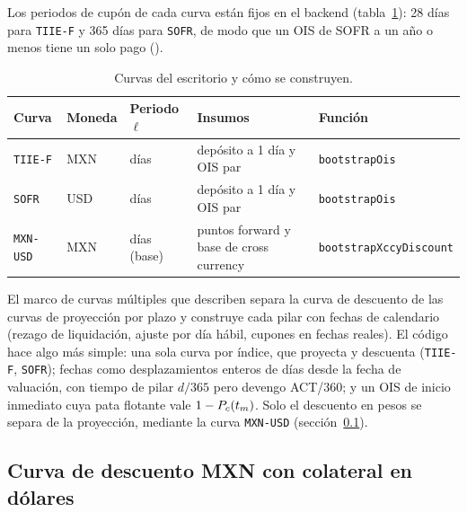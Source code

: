 Los periodos de cupón de cada curva están fijos en el backend (tabla~\ref{tab:cap02-curvas}): 28 días para
\texttt{TIIE-F} y 365 días para \texttt{SOFR}, de modo que un OIS de SOFR a un año o menos tiene un solo pago
().

\begin{table}[ht]
  \centering\small
  \caption{Curvas del escritorio y cómo se construyen.}\label{tab:cap02-curvas}
  \begin{tabular}{@{}>{\raggedright\arraybackslash}p{1.9cm}>{\raggedright\arraybackslash}p{1.3cm}>{\raggedright\arraybackslash}p{2.0cm}>{\raggedright\arraybackslash}p{3.0cm}>{\raggedright\arraybackslash}p{4.6cm}@{}}
    \toprule
    Curva & Moneda & Periodo $\ell$ & Insumos & Función \\
    \midrule
    \texttt{TIIE-F} & MXN & 28 días & depósito a 1 día y OIS par & \texttt{bootstrapOis} \\
    \texttt{SOFR} & USD & 365 días & depósito a 1 día y OIS par & \texttt{bootstrapOis} \\
    \texttt{MXN-USD} & MXN & 28 días (base) & puntos forward y base de cross currency & \texttt{bootstrapXccyDiscount} \\
    \bottomrule
  \end{tabular}
\end{table}

\begin{diferencia}
  El marco de curvas múltiples que describen \citet{ametrano2013} separa la curva de descuento de las curvas de
  proyección por plazo y construye cada pilar con fechas de calendario (rezago de liquidación, ajuste por día
  hábil, cupones en fechas reales). El código hace algo más simple: una sola curva por índice, que proyecta y
  descuenta (\texttt{TIIE-F}, \texttt{SOFR}); fechas como desplazamientos enteros de días desde la fecha de
  valuación, con tiempo de pilar $d/365$ pero devengo ACT/360; y un OIS de inicio inmediato cuya pata flotante vale
  $1-P_{c}(t_m)$. Solo el descuento en pesos se separa de la proyección, mediante la curva \texttt{MXN-USD}
  (sección~\ref{sec:cap02-xccy}).
\end{diferencia}

\subsection{Curva de descuento MXN con colateral en dólares}\label{sec:cap02-xccy}

